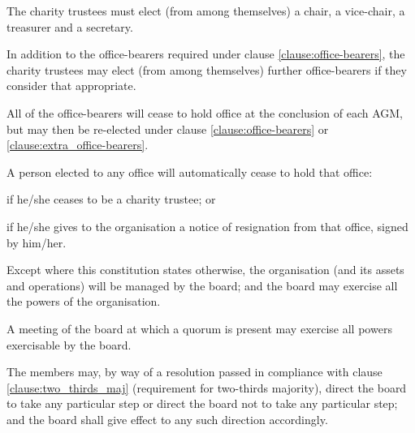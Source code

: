 ﻿\documentclass[a4paper,11pt,onecolumn ]{article}
\begin{document}
\begin{legal}
\item \label{clause:office-bearers} The charity trustees must elect (from among themselves) a chair, a vice-chair, a treasurer and a secretary.

\item \label{clause:extra_office-bearers} In addition to the office-bearers required under clause \ref{clause:office-bearers}, the charity trustees may elect (from among themselves) further office-bearers if they consider that appropriate.

\item All of the office-bearers will cease to hold office at the conclusion of each AGM, but may then be re-elected under clause \ref{clause:office-bearers} or \ref{clause:extra_office-bearers}.

\item A person elected to any office will automatically cease to hold that office:
    \begin{legal}
        \item if he/she ceases to be a charity trustee; or 
        \item if he/she gives to the organisation a notice of resignation from that office, signed by him/her.
    \end{legal}
\end{legal}


\begin{legal}
\item Except where this constitution states otherwise, the organisation (and its assets and operations) will be managed by the board; and the board may exercise all the powers of the organisation.
\item A meeting of the board at which a quorum is present may exercise all powers exercisable by the board.
\item The members may, by way of a resolution passed in compliance with clause \ref{clause:two_thirds_maj} (requirement for two-thirds majority), direct the board to take any particular step or direct the board not to take any particular step; and the board shall give effect to any such direction accordingly.
\end{legal}
\end{document}
